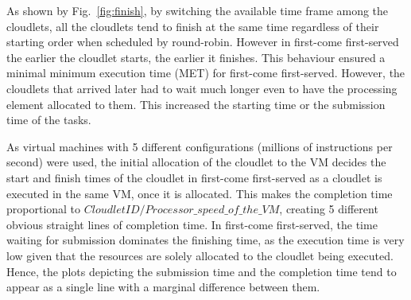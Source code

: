 \documentclass{llncs}
\begin{document}
As shown by Fig.~\ref{fig:finish}, by switching the available time frame among the cloudlets, all the cloudlets tend to finish at the same time regardless of their starting order when scheduled by round-robin. However in first-come first-served the earlier the cloudlet starts, the earlier it finishes. This behaviour ensured a minimal minimum execution time (MET) for first-come first-served. However, the cloudlets that arrived later had to wait much longer even to have the processing element allocated to them. This increased the starting time or the submission time of the tasks.

As virtual machines with 5 different configurations (millions of instructions per second) were used, the initial allocation of the cloudlet to the VM decides the start and finish times of the cloudlet in first-come first-served as a cloudlet is executed in the same VM, once it is allocated. This makes the completion time proportional to  $CloudletID/Processor\_speed\_of\_the\_VM$, creating 5 different obvious straight lines of completion time. In first-come first-served, the time waiting for submission dominates the finishing time, as the execution time is very low given that the resources are solely allocated to the cloudlet being executed. Hence, the plots depicting the submission time and the completion time tend to appear as a single line with a marginal difference between them.
\end{document}

